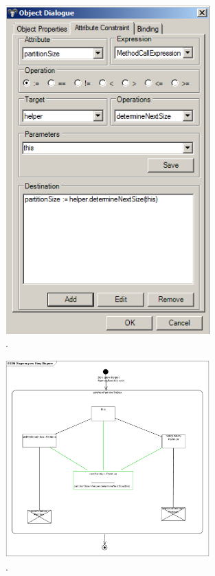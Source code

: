 \begin{figure}[htp]
\begin{center}
  \includegraphics[width=0.7\textwidth]{pics/sdmBilder/grow/sdm66}
  \caption{.}  
  \label{fig:sdm_grow_}
\end{center}
\end{figure}

\begin{figure}[htp]
\begin{center}
  \includegraphics[width=0.7\textwidth]{pics/sdmBilder/grow/sdm67}
  \caption{.}  
  \label{fig:sdm_grow_}
\end{center}
\end{figure}

\clearpage 